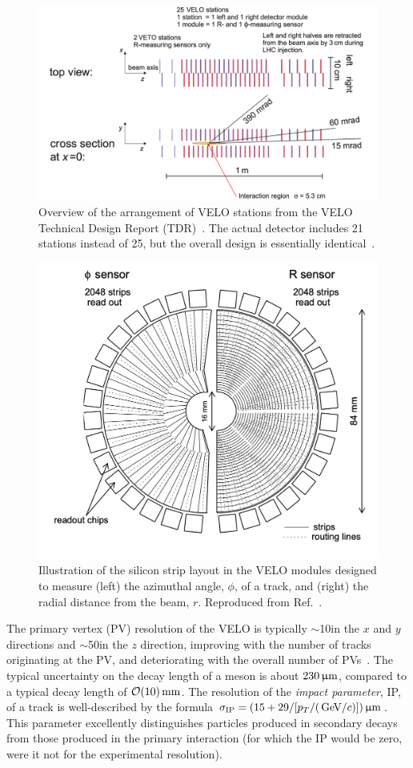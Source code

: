 \begin{figure}[tbp]
    \centering
    \includegraphics[width=0.95\columnwidth]{figures/detector/VELO_stations.png}
    \caption{Overview of the arrangement of VELO stations from the VELO Technical Design Report (TDR)~\cite{VELO-TDR}. The actual detector includes 21 stations instead of 25, but the overall design is essentially identical~\cite{VELO-Performance}.}
    \label{fig:VELO_stations}
\end{figure}

\begin{figure}[tb]
    \centering
    \includegraphics[width=0.55\columnwidth]{figures/detector/VELO_sensors.png}
    \caption{Illustration of the silicon strip layout in the VELO modules designed to measure (left) the azimuthal angle, $\phi$, of a track, and (right) the radial distance from the beam, $r$. Reproduced from Ref.~\cite{VELO-TDR}.}
    \label{fig:VELO_sensors}
\end{figure}

The primary vertex (PV) resolution of the VELO is typically $\sim $10\mum in the $x$ and $y$ directions and $\sim$50\mum in the $z$ direction, improving with the number of tracks originating at the PV, and deteriorating with the overall number of PVs~\cite{VELO-Performance}. The typical uncertainty on the decay length of a \B meson is about $230\,\upmu\text{m}$, compared to a typical decay length of $\mathcal O(10)\text{\,mm}$. The resolution of the \emph{impact parameter}, IP, of a track is well-described by the formula $\sigma_\mathrm{IP}=(15+29/[p_T/(\text{\,Ge\kern -0.1em V}/c)])\,\upmu\text{m}$. This parameter excellently distinguishes particles produced in secondary decays from those produced in the primary interaction (for which the IP would be zero, were it not for the experimental resolution).

